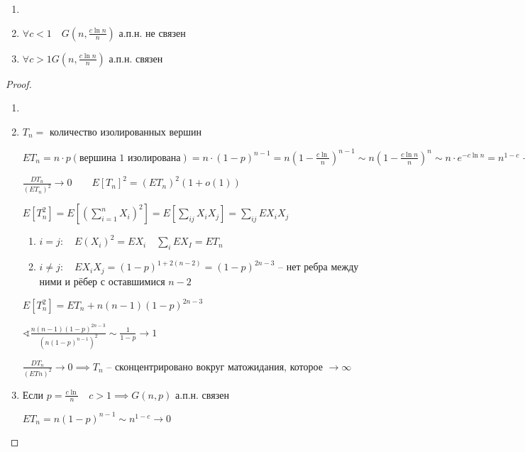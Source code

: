 \documentclass{book}
\theoremstyle{definition}
\begin{document}
\begin{theorem}
    \begin{enumerate}
        \item []
        \item $\forall c<1\quad G(n, \frac{c\ln n}{n})$ а.п.н. не связен
        \item $\forall c > 1 G\left( n, \frac{c\ln n}{n} \right) $ а.п.н. связен
    \end{enumerate}
\end{theorem}
\begin{proof}
    \begin{enumerate}
        \item [] 
        \item $T_n = $ количество изолированных вершин

            $E T_n = n\cdot p\left( \text{вершина 1 изолирована} \right) = n\cdot \left( 1- p\right)^{n-1} = n\left( 1 - \frac{c\ln }{n} \right) ^{n-1} \sim n\left( 1- \frac{c\ln n}{n} \right) ^n \sim n \cdot  e^{-c\ln n} =n^{1-c} \to \infty \quad 1-c>0 $ 
        
            $\frac{DT_n}{\left( ET_n \right) ^2} \to 0\qquad E\left[ T_n \right] ^2 = \left( ET_n \right) ^2\left( 1 + o(1) \right) $

            $E\left[ T_n^2 \right] = E\left[\left( \sum_{i=1}^{n} X_i \right) ^2\right] = E\left[ \sum_{ij} X_iX_j \right] = \sum_{ij}EX_iX_j $ 

            \begin{enumerate}
                \item $i = j:\quad E\left( X_i \right)^2 = EX_i\quad\sum _i E X_I = ET_n $
                \item $i\neq j:\quad E X_iX_j = (1-p)^{1 + 2(n-2)} = (1-p)^{2n-3}$ -- нет ребра между ними и рёбер с оставшимися $n-2$
            \end{enumerate}

            $E\left[ T_n^2 \right]  = ET_n + n(n-1)(1 -p)^{2n-3}$

            $\sphericalangle \frac{n(n-1)(1-p)^{2n-3}}{\left( n(1-p)^{n-1} \right) ^2} \sim \frac{1}{1-p} \to 1$ 

            $\frac{DT_n}{\left( ETn \right) ^2}\to 0 \implies T_n$ -- сконцентрировано вокруг матожидания, которое $\to \infty $

        \item Если $p = \frac{c\ln }{n}\quad c>1\implies G(n, p)$ а.п.н. связен

            $ET_n = n\left( 1-p \right) ^{n-1}\sim n^{1-c} \to 0$


\end{enumerate}
\end{proof}
\end{document}
